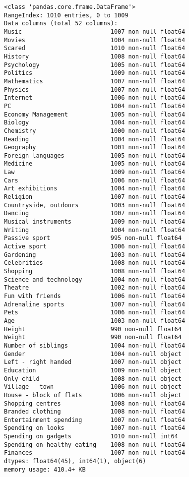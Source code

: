 \documentclass[11pt]{article}
\begin{document}
    \begin{Verbatim}[commandchars=\\\{\}]
<class 'pandas.core.frame.DataFrame'>
RangeIndex: 1010 entries, 0 to 1009
Data columns (total 52 columns):
Music                         1007 non-null float64
Movies                        1004 non-null float64
Scared                        1010 non-null float64
History                       1008 non-null float64
Psychology                    1005 non-null float64
Politics                      1009 non-null float64
Mathematics                   1007 non-null float64
Physics                       1007 non-null float64
Internet                      1006 non-null float64
PC                            1004 non-null float64
Economy Management            1005 non-null float64
Biology                       1004 non-null float64
Chemistry                     1000 non-null float64
Reading                       1004 non-null float64
Geography                     1001 non-null float64
Foreign languages             1005 non-null float64
Medicine                      1005 non-null float64
Law                           1009 non-null float64
Cars                          1006 non-null float64
Art exhibitions               1004 non-null float64
Religion                      1007 non-null float64
Countryside, outdoors         1003 non-null float64
Dancing                       1007 non-null float64
Musical instruments           1009 non-null float64
Writing                       1004 non-null float64
Passive sport                 995 non-null float64
Active sport                  1006 non-null float64
Gardening                     1003 non-null float64
Celebrities                   1008 non-null float64
Shopping                      1008 non-null float64
Science and technology        1004 non-null float64
Theatre                       1002 non-null float64
Fun with friends              1006 non-null float64
Adrenaline sports             1007 non-null float64
Pets                          1006 non-null float64
Age                           1003 non-null float64
Height                        990 non-null float64
Weight                        990 non-null float64
Number of siblings            1004 non-null float64
Gender                        1004 non-null object
Left - right handed           1007 non-null object
Education                     1009 non-null object
Only child                    1008 non-null object
Village - town                1006 non-null object
House - block of flats        1006 non-null object
Shopping centres              1008 non-null float64
Branded clothing              1008 non-null float64
Entertainment spending        1007 non-null float64
Spending on looks             1007 non-null float64
Spending on gadgets           1010 non-null int64
Spending on healthy eating    1008 non-null float64
Finances                      1007 non-null float64
dtypes: float64(45), int64(1), object(6)
memory usage: 410.4+ KB

    \end{Verbatim}
\end{document}
